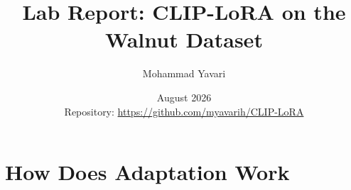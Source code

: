 \documentclass[letterpaper,11pt,leqno]{article}
\begin{document}
\title{Lab Report: CLIP-LoRA on the Walnut Dataset}
\author{Mohammad Yavari}
\date{August 2026 \\[0.5em] \small Repository: \url{https://github.com/myavarih/CLIP-LoRA}}

\begin{titlepage}
\maketitle
\end{titlepage}

\tableofcontents
\newpage

\section{How Does Adaptation Work}
\end{document}
